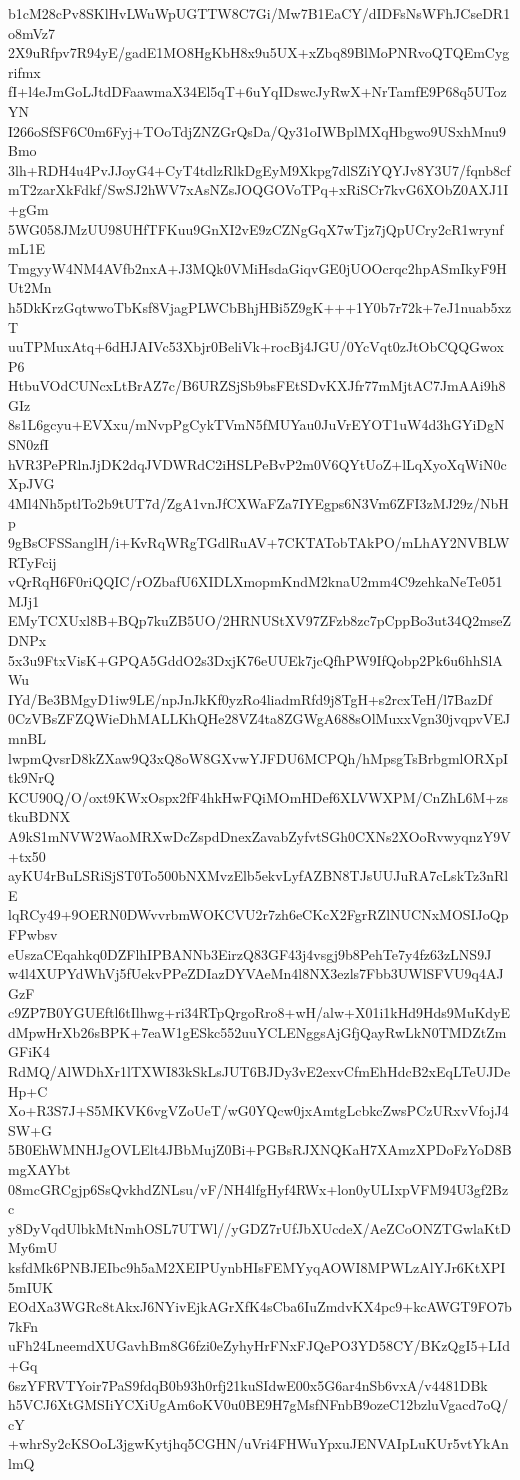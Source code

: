 b1cM28cPv8SKlHvLWuWpUGTTW8C7Gi/Mw7B1EaCY/dIDFsNsWFhJCseDR1o8mVz7
2X9uRfpv7R94yE/gadE1MO8HgKbH8x9u5UX+xZbq89BlMoPNRvoQTQEmCygrifmx
fI+l4eJmGoLJtdDFaawmaX34El5qT+6uYqIDswcJyRwX+NrTamfE9P68q5UTozYN
I266oSfSF6C0m6Fyj+TOoTdjZNZGrQsDa/Qy31oIWBplMXqHbgwo9USxhMnu9Bmo
3lh+RDH4u4PvJJoyG4+CyT4tdlzRlkDgEyM9Xkpg7dlSZiYQYJv8Y3U7/fqnb8cf
mT2zarXkFdkf/SwSJ2hWV7xAsNZsJOQGOVoTPq+xRiSCr7kvG6XObZ0AXJ1I+gGm
5WG058JMzUU98UHfTFKuu9GnXI2vE9zCZNgGqX7wTjz7jQpUCry2cR1wrynfmL1E
TmgyyW4NM4AVfb2nxA+J3MQk0VMiHsdaGiqvGE0jUOOcrqc2hpASmIkyF9HUt2Mn
h5DkKrzGqtwwoTbKsf8VjagPLWCbBhjHBi5Z9gK+++1Y0b7r72k+7eJ1nuab5xzT
uuTPMuxAtq+6dHJAIVc53Xbjr0BeliVk+rocBj4JGU/0YcVqt0zJtObCQQGwoxP6
HtbuVOdCUNcxLtBrAZ7c/B6URZSjSb9bsFEtSDvKXJfr77mMjtAC7JmAAi9h8GIz
8s1L6gcyu+EVXxu/mNvpPgCykTVmN5fMUYau0JuVrEYOT1uW4d3hGYiDgNSN0zfI
hVR3PePRlnJjDK2dqJVDWRdC2iHSLPeBvP2m0V6QYtUoZ+lLqXyoXqWiN0cXpJVG
4Ml4Nh5ptlTo2b9tUT7d/ZgA1vnJfCXWaFZa7IYEgps6N3Vm6ZFI3zMJ29z/NbHp
9gBsCFSSanglH/i+KvRqWRgTGdlRuAV+7CKTATobTAkPO/mLhAY2NVBLWRTyFcij
vQrRqH6F0riQQIC/rOZbafU6XIDLXmopmKndM2knaU2mm4C9zehkaNeTe051MJj1
EMyTCXUxl8B+BQp7kuZB5UO/2HRNUStXV97ZFzb8zc7pCppBo3ut34Q2mseZDNPx
5x3u9FtxVisK+GPQA5GddO2s3DxjK76eUUEk7jcQfhPW9IfQobp2Pk6u6hhSlAWu
IYd/Be3BMgyD1iw9LE/npJnJkKf0yzRo4liadmRfd9j8TgH+s2rcxTeH/l7BazDf
0CzVBsZFZQWieDhMALLKhQHe28VZ4ta8ZGWgA688sOlMuxxVgn30jvqpvVEJmnBL
lwpmQvsrD8kZXaw9Q3xQ8oW8GXvwYJFDU6MCPQh/hMpsgTsBrbgmlORXpItk9NrQ
KCU90Q/O/oxt9KWxOspx2fF4hkHwFQiMOmHDef6XLVWXPM/CnZhL6M+zstkuBDNX
A9kS1mNVW2WaoMRXwDcZspdDnexZavabZyfvtSGh0CXNs2XOoRvwyqnzY9V+tx50
ayKU4rBuLSRiSjST0To500bNXMvzElb5ekvLyfAZBN8TJsUUJuRA7cLskTz3nRlE
lqRCy49+9OERN0DWvvrbmWOKCVU2r7zh6eCKcX2FgrRZlNUCNxMOSIJoQpFPwbsv
eUszaCEqahkq0DZFlhIPBANNb3EirzQ83GF43j4vsgj9b8PehTe7y4fz63zLNS9J
w4l4XUPYdWhVj5fUekvPPeZDIazDYVAeMn4l8NX3ezls7Fbb3UWlSFVU9q4AJGzF
c9ZP7B0YGUEftl6tIlhwg+ri34RTpQrgoRro8+wH/alw+X01i1kHd9Hds9MuKdyE
dMpwHrXb26sBPK+7eaW1gESkc552uuYCLENggsAjGfjQayRwLkN0TMDZtZmGFiK4
RdMQ/AlWDhXr1lTXWI83kSkLsJUT6BJDy3vE2exvCfmEhHdcB2xEqLTeUJDeHp+C
Xo+R3S7J+S5MKVK6vgVZoUeT/wG0YQcw0jxAmtgLcbkcZwsPCzURxvVfojJ4SW+G
5B0EhWMNHJgOVLElt4JBbMujZ0Bi+PGBsRJXNQKaH7XAmzXPDoFzYoD8BmgXAYbt
08mcGRCgjp6SsQvkhdZNLsu/vF/NH4lfgHyf4RWx+lon0yULIxpVFM94U3gf2Bzc
y8DyVqdUlbkMtNmhOSL7UTWl//yGDZ7rUfJbXUcdeX/AeZCoONZTGwlaKtDMy6mU
ksfdMk6PNBJEIbc9h5aM2XEIPUynbHIsFEMYyqAOWI8MPWLzAlYJr6KtXPI5mIUK
EOdXa3WGRc8tAkxJ6NYivEjkAGrXfK4sCba6IuZmdvKX4pc9+kcAWGT9FO7b7kFn
uFh24LneemdXUGavhBm8G6fzi0eZyhyHrFNxFJQePO3YD58CY/BKzQgI5+LId+Gq
6szYFRVTYoir7PaS9fdqB0b93h0rfj21kuSIdwE00x5G6ar4nSb6vxA/v4481DBk
h5VCJ6XtGMSIiYCXiUgAm6oKV0u0BE9H7gMsfNFnbB9ozeC12bzluVgacd7oQ/cY
+whrSy2cKSOoL3jgwKytjhq5CGHN/uVri4FHWuYpxuJENVAIpLuKUr5vtYkAnlmQ
